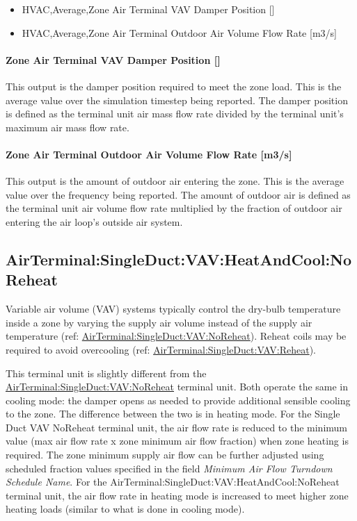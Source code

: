\begin{itemize}
\item
  HVAC,Average,Zone Air Terminal VAV Damper Position {[]}
\item
  HVAC,Average,Zone Air Terminal Outdoor Air Volume Flow Rate {[}m3/s{]}
\end{itemize}

\paragraph{Zone Air Terminal VAV Damper Position {[]}}\label{zone-air-terminal-vav-damper-position-3}

This output is the damper position required to meet the zone load. This is the average value over the simulation timestep being reported. The damper position is defined as the terminal unit air mass flow rate divided by the terminal unit's maximum air mass flow rate.

\paragraph{Zone Air Terminal Outdoor Air Volume Flow Rate {[}m3/s{]}}

This output is the amount of outdoor air entering the zone. This is the average value over the frequency being reported. The amount of outdoor air is defined as the terminal unit air volume flow rate multiplied by the fraction of outdoor air entering the air loop's outside air system.

\subsection{AirTerminal:SingleDuct:VAV:HeatAndCool:NoReheat}\label{airterminalsingleductvavheatandcoolnoreheat}

Variable air volume (VAV) systems typically control the dry-bulb temperature inside a zone by varying the supply air volume instead of the supply air temperature (ref: \hyperref[airterminalsingleductvavnoreheat]{AirTerminal:SingleDuct:VAV:NoReheat}). Reheat coils may be required to avoid overcooling (ref: \hyperref[airterminalsingleductvavreheat]{AirTerminal:SingleDuct:VAV:Reheat}).

This terminal unit is slightly different from the \hyperref[airterminalsingleductvavnoreheat]{AirTerminal:SingleDuct:VAV:NoReheat} terminal unit. Both operate the same in cooling mode: the damper opens as needed to provide additional sensible cooling to the zone. The difference between the two is in heating mode. For the Single Duct VAV NoReheat terminal unit, the air flow rate is reduced to the minimum value (max air flow rate x zone minimum air flow fraction) when zone heating is required. The zone minimum supply air flow can be further adjusted using scheduled fraction values specified in the field \textit{Minimum Air Flow Turndown Schedule Name}. For the AirTerminal:SingleDuct:VAV:HeatAndCool:NoReheat terminal unit, the air flow rate in heating mode is increased to meet higher zone heating loads (similar to what is done in cooling mode).

